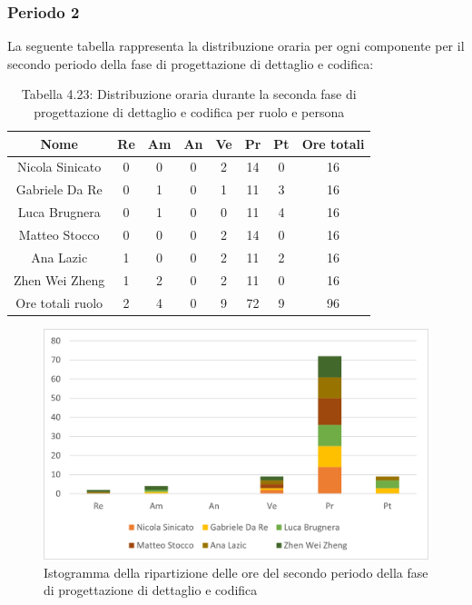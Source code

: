 \subsubsection{Periodo 2}
%
La seguente tabella rappresenta la distribuzione oraria per ogni componente per il secondo periodo della fase di progettazione di dettaglio e codifica:
\begin{table}[h]
	\setlength\extrarowheight{5pt}
	\centering
	\begin{tabularx}{\textwidth}{|ccccccc|c|}
		\hline
		\rowcolor{white}
		\textbf{Nome} & \textbf{Re} & \textbf{Am} & \textbf{An} & \textbf{Ve} & \textbf{Pr}& \textbf{Pt} & \textbf{Ore totali} \\
		\hline
		Nicola Sinicato &0&0&0&2&14&0&16 \\
		Gabriele Da Re &0&1&0&1&11&3&16 \\
		Luca Brugnera &0&1&0&0&11&4&16 \\
		Matteo Stocco &0&0&0&2&14&0&16 \\
		Ana Lazic &1&0&0&2&11&2&16 \\
		Zhen Wei Zheng &1&2&0&2&11&0&16 \\
		\hline
		Ore totali ruolo &2&4&0&9&72&9&96 \\
		\hline
	\end{tabularx}
	\vspace{10pt}
	\caption{Tabella 4.23: Distribuzione oraria durante la seconda fase di progettazione di dettaglio e codifica per ruolo e persona}
\end{table}
\begin{figure}[H]
    \centering
    \includegraphics[scale=0.6]{img/grafi preventivo/istogrammi/codifica/periodo2.png}
    \caption{Istogramma della ripartizione delle ore del secondo periodo della fase di progettazione di dettaglio e codifica}
\end{figure}

